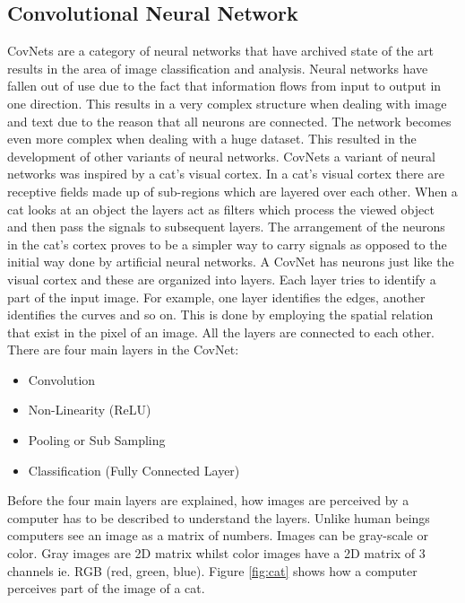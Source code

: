\documentclass[12pt, a4paper,oneside]{report}
\begin{document}
\subsection{Convolutional Neural Network}
CovNets are a category of neural networks that have archived state of the art results in the area of image classification and analysis. Neural networks have fallen out of use due to the fact that information flows from input to output in one direction. This results in a very complex structure when dealing with image and text due to the reason that all neurons are connected. The network becomes even more complex when dealing with a huge dataset. This resulted in the development of other variants of neural networks. CovNets a variant of neural networks was inspired by a cat’s visual cortex. In a cat's visual cortex there are receptive fields made up of sub-regions which are layered over each other. When a cat looks at an object the layers act as filters which process the viewed object and then pass the signals to subsequent layers. The arrangement of the neurons in the cat's cortex proves to be a simpler way to carry signals as opposed to the initial way done by artificial neural networks. A CovNet has neurons just like the visual cortex and these are organized into layers. Each layer tries to identify a part of the input image. For example, one layer identifies the edges, another identifies the curves and so on. This is done by employing the spatial relation that exist in the pixel of an image. All the layers are connected to each other. There are four main layers in the CovNet:

\begin{itemize}
	\item Convolution
	\item Non-Linearity (ReLU)
	\item Pooling or Sub Sampling
	\item Classification (Fully Connected Layer)
\end{itemize} 

Before the four main layers are explained, how images are perceived by a computer has to be described to understand the layers. Unlike human beings computers see an image as a matrix of numbers. Images can be gray-scale or color. Gray images are 2D matrix whilst color images have a 2D matrix of 3 channels ie. RGB (red, green, blue). Figure \ref{fig:cat} shows how a computer perceives part of the image of a cat.
\end{document}
